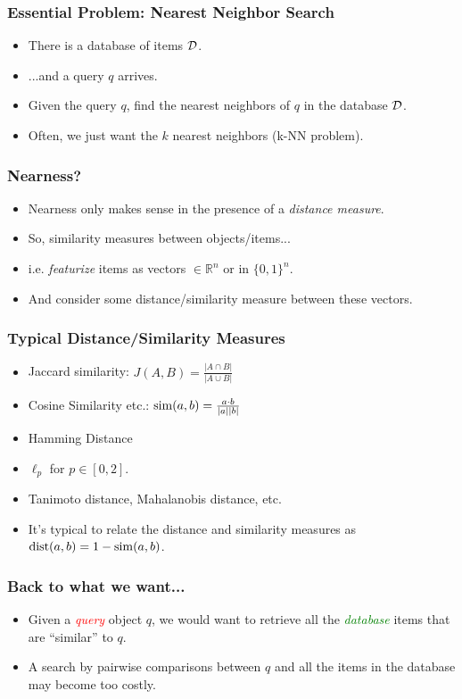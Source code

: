 \documentclass{beamer}
\begin{document}
\begin{frame}
\frametitle{Essential Problem: Nearest Neighbor Search}
\begin{itemize}
\item There is a database of items $\cal{D}$. 
\item ...and a query $q$ arrives. 
\pause
\item Given the query $q$, find the nearest neighbors of $q$ in the database $\cal{D}$. 
\pause
\item Often, we just want the $k$ nearest neighbors (k-NN problem).
\end{itemize}
\end{frame}

\begin{frame}
\frametitle{Nearness?}
\begin{itemize}
\item Nearness only makes sense in the presence of a {\em distance measure}.
\pause 
\item So, similarity measures between objects/items...
\item i.e. {\em featurize} items \pause as vectors $\in \mathbb{R}^n$ or in $\{0, 1\}^n$. 
\pause
\item And consider some distance/similarity measure between these vectors. 
\end{itemize}
\end{frame}

\begin{frame}
\frametitle{Typical Distance/Similarity Measures}
\begin{itemize}
\item Jaccard similarity: $J(A, B) = \frac{|A \cap B|}{|A \cup B|}$
\pause
\item Cosine Similarity etc.: $\mathrm{sim}(a, b) = \frac{a \cdot b}{|a||b|}$
\pause
\item Hamming Distance
\item $\ell_p$ for $p \in \left[0, 2\right]$.
\item Tanimoto distance, Mahalanobis distance, etc. 
\pause
\item It's typical to relate the distance and similarity measures as $\mathrm{dist}(a, b) = 1 -\mathrm{sim}(a, b)$.
\end{itemize}
\end{frame}

\begin{frame}
\frametitle{Back to what we want...}
\begin{itemize}
\item Given a \textcolor{red}{\em query} object $q$, we would want to retrieve all the \textcolor{green}{\em database} items that are ``similar'' to $q$.
\pause
\item A search by pairwise comparisons between $q$ and all the items in the database may become too costly.
\end{itemize}
\end{frame}
\end{document}
